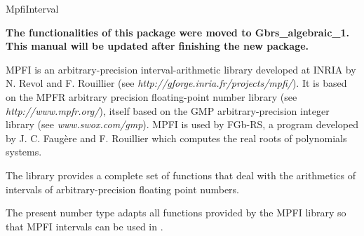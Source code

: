 %
%
%
%
% 
%

\begin{ccPkgDescription}{MpfiInterval \label{MpfiInterval}}

\textbf{The functionalities of this package were moved to Gbrs\_algebraic\_1.
This manual will be updated after finishing the new package.}

MPFI is an arbitrary-precision interval-arithmetic library developed at INRIA
by N. Revol and F. Rouillier
(see \emph{http://gforge.inria.fr/projects/mpfi/}).
It is based on the MPFR arbitrary precision floating-point number library (see
\emph{http://www.mpfr.org/}), itself based on the GMP arbitrary-precision
integer library (see \emph{www.swox.com/gmp}).
MPFI is used by FGb-RS, a program developed by J. C. Faug\`ere and F. Rouillier
which computes the real roots of polynomials systems.

The library provides a complete set of functions that deal with the arithmetics
of intervals of arbitrary-precision floating point numbers.

The present number type adapts all functions provided by the MPFI library so
that MPFI intervals can be used in {\cgal}.


\end{ccPkgDescription}
